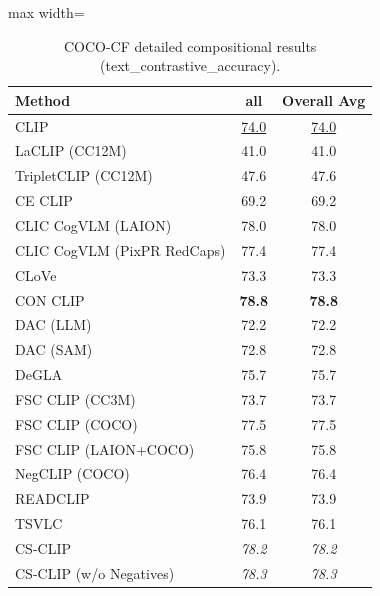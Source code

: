 \begin{table}[t]
  \centering
  \scriptsize
  \caption{COCO-CF detailed compositional results (text_contrastive_accuracy).}
  \label{tab:COCO-CF_detailed}
  \begin{adjustbox}{max width=\textwidth}
  \setlength{\tabcolsep}{2pt}
  \begin{tabular}{p{5cm}c|c}
    \toprule
    Method & all & Overall Avg \\
    \midrule
    CLIP & \underline{74.0} & \underline{74.0} \\
    \midrule
    LaCLIP (CC12M) & 41.0 & 41.0 \\
    TripletCLIP (CC12M) & 47.6 & 47.6 \\
    \midrule
    CE CLIP & 69.2 & 69.2 \\
    CLIC CogVLM (LAION) & 78.0 & 78.0 \\
    CLIC CogVLM (PixPR RedCaps) & 77.4 & 77.4 \\
    CLoVe & 73.3 & 73.3 \\
    CON CLIP & \textbf{78.8} & \textbf{78.8} \\
    DAC (LLM) & 72.2 & 72.2 \\
    DAC (SAM) & 72.8 & 72.8 \\
    DeGLA & 75.7 & 75.7 \\
    FSC CLIP (CC3M) & 73.7 & 73.7 \\
    FSC CLIP (COCO) & 77.5 & 77.5 \\
    FSC CLIP (LAION+COCO) & 75.8 & 75.8 \\
    NegCLIP (COCO) & 76.4 & 76.4 \\
    READCLIP & 73.9 & 73.9 \\
    TSVLC & 76.1 & 76.1 \\
    \midrule
    CS-CLIP & \emph{78.2} & \emph{78.2} \\
    CS-CLIP (w/o Negatives) & \emph{78.3} & \emph{78.3} \\
    \bottomrule
  \end{tabular}
  \end{adjustbox}
\end{table}